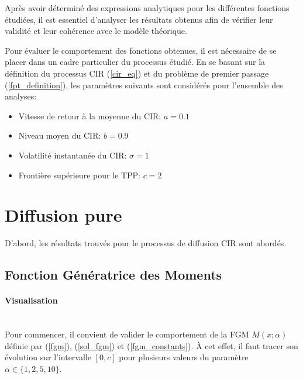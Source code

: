 \label{sec:Theme2}

Après avoir déterminé des expressions analytiques pour les différentes fonctions étudiées, il est essentiel d'analyser les résultats obtenus afin de vérifier leur validité et leur cohérence avec le modèle théorique. 

Pour évaluer le comportement des fonctions obtenues, il est nécessaire de se placer dans un cadre particulier du processus étudié. En se basant sur la définition du processus \acs{CIR} (\ref{cir_eq}) et du problème de premier passage (\ref{fpt_definition}), les paramètres suivants sont considérés pour l'ensemble des analyses:

\begin{itemize}
    \item Vitesse de retour à la moyenne du \acs{CIR}: $a=0.1$
    \item Niveau moyen du \acs{CIR}: $b=0.9$
    \item Volatilité instantanée du \acs{CIR}: $\sigma=1$
    \item Frontière supérieure pour le \acs{TPP}: $c=2$
\end{itemize}

\section{Diffusion pure}

D'abord, les résultats trouvés pour le processus de diffusion \acs{CIR} sont abordés.

\subsection{Fonction Génératrice des Moments}

\paragraph{Visualisation}\phantom{}\\
Pour commencer, il convient de valider le comportement de la \acl{FGM} $M(x;\alpha)$ définie par (\ref{fgm}), (\ref{sol_fgm}) et (\ref{fgm_constants}). À cet effet, il faut tracer son évolution sur l'intervalle $[0, c]$ pour plusieurs valeurs du paramètre $\alpha \in \{1, 2, 5, 10\}$. 


